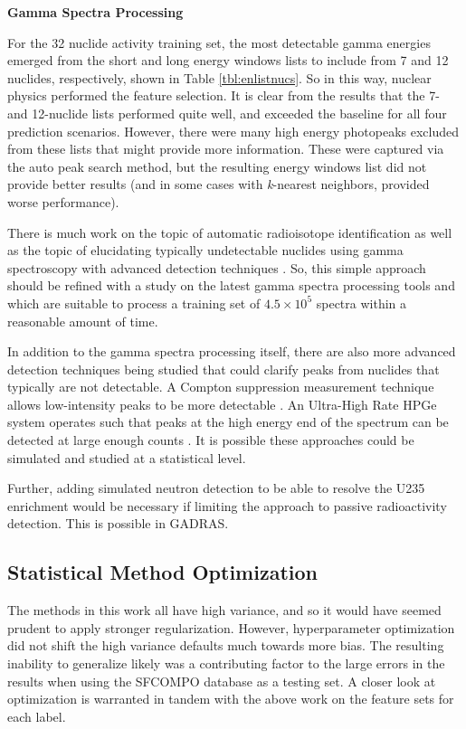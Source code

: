 \noindent \textbf{Gamma Spectra Processing}

For the 32 nuclide activity training set, the most detectable gamma energies
emerged from the short and long energy windows lists to include from 7 and 12
nuclides, respectively, shown in Table \ref{tbl:enlistnucs}. So in this way,
nuclear physics performed the feature selection.  It is clear from the results
that the 7- and 12-nuclide lists performed quite well, and exceeded the
baseline for all four prediction scenarios.  However, there were many high
energy photopeaks excluded from these lists that might provide more
information. These were captured via the auto peak search method, but the
resulting energy windows list did not provide better results (and in some cases
with \textit{k}-nearest neighbors, provided worse performance).  

There is much work on the topic of automatic radioisotope identification
\cite{riid_09, rapid_riid_18, sull_gen_07, sull_valid_15, sull_auto_17,
sull_unc_17, dayman_gamma_fp, dayman_gamma_auto} as well as the topic of
elucidating typically undetectable nuclides using gamma spectroscopy with
advanced detection techniques \cite{compton_supp, snf_gamma}.  So, this simple
approach should be refined with a study on the latest gamma spectra processing
tools and which are suitable to process a training set of $4.5 \times 10^5$
spectra within a reasonable amount of time.  

In addition to the gamma spectra processing itself, there are also more
advanced detection techniques being studied that could clarify peaks from
nuclides that typically are not detectable. A Compton suppression measurement
technique allows low-intensity peaks to be more detectable \cite{compton_supp}.
An Ultra-High Rate \gls{HPGe} system operates such that peaks at the high
energy end of the spectrum can be detected at large enough counts
\cite{snf_gamma}. It is possible these approaches could be simulated and
studied at a statistical level. 

Further, adding simulated neutron detection to be able to resolve the
\gls{U235} enrichment would be necessary if limiting the approach to passive
radioactivity detection. This is possible in \gls{GADRAS}.

\subsection{Statistical Method Optimization}

The methods in this work all have high variance, and so it would have seemed
prudent to apply stronger regularization. However, hyperparameter optimization
did not shift the high variance defaults much towards more bias.  The resulting
inability to generalize likely was a contributing factor to the large errors in
the results when using the \gls{SFCOMPO} database as a testing set. A closer
look at optimization is warranted in tandem with the above work on the feature
sets for each label.

